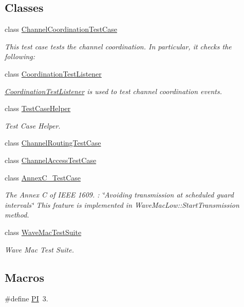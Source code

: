 \subsection*{Classes}
\begin{DoxyCompactItemize}
\item 
class \hyperlink{classChannelCoordinationTestCase}{Channel\+Coordination\+Test\+Case}
\begin{DoxyCompactList}\small\item\em This test case tests the channel coordination. In particular, it checks the following\+: \end{DoxyCompactList}\item 
class \hyperlink{classCoordinationTestListener}{Coordination\+Test\+Listener}
\begin{DoxyCompactList}\small\item\em \hyperlink{classCoordinationTestListener}{Coordination\+Test\+Listener} is used to test channel coordination events. \end{DoxyCompactList}\item 
class \hyperlink{classTestCaseHelper}{Test\+Case\+Helper}
\begin{DoxyCompactList}\small\item\em Test Case Helper. \end{DoxyCompactList}\item 
class \hyperlink{classChannelRoutingTestCase}{Channel\+Routing\+Test\+Case}
\item 
class \hyperlink{classChannelAccessTestCase}{Channel\+Access\+Test\+Case}
\item 
class \hyperlink{classAnnexC__TestCase}{Annex\+C\+\_\+\+Test\+Case}
\begin{DoxyCompactList}\small\item\em The Annex C of I\+E\+EE 1609. \+: \char`\"{}\+Avoiding transmission at scheduled guard intervals\char`\"{} This feature is implemented in Wave\+Mac\+Low\+::\+Start\+Transmission method. \end{DoxyCompactList}\item 
class \hyperlink{classWaveMacTestSuite}{Wave\+Mac\+Test\+Suite}
\begin{DoxyCompactList}\small\item\em Wave Mac Test Suite. \end{DoxyCompactList}\end{DoxyCompactItemize}
\subsection*{Macros}
\begin{DoxyCompactItemize}
\item 
\#define \hyperlink{mac-extension-test-suite_8cc_a598a3330b3c21701223ee0ca14316eca}{PI}~3.
\end{DoxyCompactItemize}
